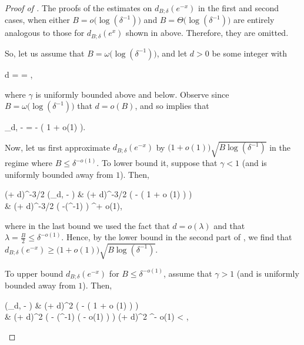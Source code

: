 	\begin{proof}[Proof of ]
	
	The proofs of the estimates on $d_{B; \delta} (e^{-x})$ in the first and second cases, when either $B = o \big( \log (\delta^{-1}) \big)$ and $B = \Theta \Big( \log (\delta^{-1}) \Big)$ are entirely analogous to those for $d_{B; \delta} (e^x)$ shown in  above. Therefore, they are omitted.
	
	So, let us assume that $B = \omega \big( \log (\delta^{-1}) \big)$, and let $d > 0$ be some integer with 
	\begin{flalign*}
	d =  = ,
	\end{flalign*}
	
	\noindent where $\gamma$ is uniformly bounded above and below. Observe since $B = \omega \big( \log (\delta^{-1}) \big)$ that $d = o (B)$, and so  implies that 
	\begin{flalign*}
	\Psi_{d, \lambda} - \lambda = -\displaystyle{} \big( 1 + o(1) \big).
	\end{flalign*}
	
	Now, let us first approximate $d_{B; \delta} (e^{-x})$ by $( 1 + o(1) \big) \sqrt{B \log (\delta^{-1})}$ in the regime where $B \le \delta^{-o(1)}$. To lower bound it, suppose that $\gamma < 1$ (and is uniformly bounded away from $1$). Then, 
	\begin{flalign*}
	(\lambda + d)^{-3/2} \exp (\Psi_{d, \lambda} - \lambda) & \ge (\lambda + d)^{-3/2} \exp \Big( -\displaystyle{} \big( 1 + o (1) \big) \Big) \\
	& \ge (\lambda + d)^{-3/2} \exp \Big( -\gamma \log (\delta^{-1}) \Big) \ge \delta^{\gamma + o(1)},
	\end{flalign*}
	
	\noindent where in the last bound we used the fact that $d = o (\lambda)$ and that $\lambda = \frac{B}{2} \le \delta^{-o(1)}$. Hence, by the lower bound in the second part of , we find that $d_{B; \delta} (e^{-x}) \ge \big( 1 + o (1) \big) \sqrt{ B \log (\delta^{-1})}$.
	
	To upper bound $d_{B; \delta} (e^{-x})$ for $B \le \delta^{-o(1)}$, assume that $\gamma > 1$ (and is uniformly bounded away from $1$). Then,
	\begin{flalign*}
	\exp (\Psi_{d, \lambda} - \lambda) & \le (\lambda + d)^2 \exp \Big( -\displaystyle{} \big( 1 + o (1) \big) \Big) \\
	& \le (\lambda + d)^2 \exp \Big( - \log (\delta^{-1}) \big( \gamma - o(1) \big) \Big) \le (\lambda + d)^2 \delta^{\gamma - o(1)} < \delta,
	\end{flalign*}
	

\end{proof}
